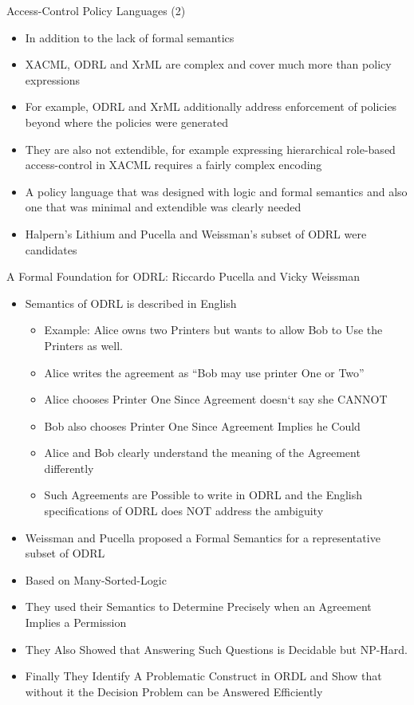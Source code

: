 \documentclass{beamer}
\begin{document}
\begin{frame}{Access-Control Policy Languages (2)}
\begin{itemize}
    \item In addition to the lack of formal semantics
    \item XACML, ODRL and XrML are complex and cover much more than policy expressions     
    \item For example, ODRL and XrML additionally address enforcement of policies beyond where the policies were generated
    \item They are also not extendible, for example expressing hierarchical role-based access-control in XACML requires a fairly complex encoding
    \item A policy language that was designed with logic and formal semantics and also one that was minimal and extendible was clearly needed 
    \item Halpern's Lithium and Pucella and Weissman's subset of ODRL were candidates
\end{itemize}
\end{frame}


\begin{frame}[fragile]{A Formal Foundation for ODRL: \newline Riccardo Pucella and Vicky Weissman}
\Large
\begin{itemize}
\item Semantics of ODRL is described in English
   \begin{itemize}
      \item Example: Alice owns two Printers but wants to allow Bob to Use the Printers as well. 
      \item Alice writes the agreement as ``Bob may use printer One or Two''
      \item Alice chooses Printer One Since Agreement doesn`t say she CANNOT
      \item Bob also chooses Printer One Since Agreement Implies he Could
      \item Alice and Bob clearly understand the meaning of the Agreement differently
      \item Such Agreements are Possible to write in ODRL and the English specifications of ODRL does NOT address the ambiguity
    \end{itemize}

\item Weissman and Pucella proposed a Formal Semantics for a representative subset of ODRL
\item Based on Many-Sorted-Logic
\item They used their Semantics to Determine Precisely when an Agreement Implies a Permission
\item They Also Showed that Answering Such Questions is Decidable but NP-Hard.
\item Finally They Identify A Problematic Construct in ORDL and Show that without it the Decision Problem can be Answered Efficiently

\end{itemize}
\end{frame}
\end{document}
